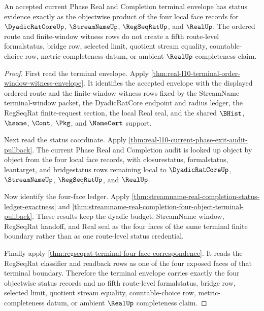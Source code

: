 \begin{theorem}
\label{thm:real-l10-terminal-envelope-status-locality}
An accepted current Phase Real and Completion terminal envelope has status
evidence exactly as the objectwise product of the four local face records for
$\DyadicRatCoreUp$, $\StreamNameUp$, $\RegSeqRatUp$, and $\RealUp$. The ordered
route and finite-window witness rows do not create a fifth route-level
formalstatus, bridge row, selected limit, quotient stream equality,
countable-choice row, metric-completeness datum, or ambient $\RealUp$
completeness claim.
\end{theorem}
\begin{proof}
First read the terminal envelope. Apply
\autoref{thm:real-l10-terminal-order-window-witness-envelope}. It identifies
the accepted envelope with the displayed ordered route and the finite-window
witness rows fixed by the StreamName terminal-window packet, the DyadicRatCore
endpoint and radius ledger, the RegSeqRat finite-request section, the local Real
seal, and the shared $\BHist$, $\hsame$, $\Cont$, $\Pkg$, and $\NameCert$
support.

Next read the status coordinate. Apply
\autoref{thm:real-l10-current-phase-exit-audit-pullback}. The current Phase
Real and Completion audit is looked up object by object from the four local face
records, with closurestatus, formalstatus, leantarget, and bridgestatus rows
remaining local to $\DyadicRatCoreUp$, $\StreamNameUp$, $\RegSeqRatUp$, and
$\RealUp$.

Now identify the four-face ledger. Apply
\autoref{thm:streamname-real-completion-status-ledger-exactness} and
\autoref{thm:streamname-real-completion-four-object-terminal-pullback}. These
results keep the dyadic budget, StreamName window, RegSeqRat handoff, and Real
seal as the four faces of the same terminal finite boundary rather than as one
route-level status credential.

Finally apply \autoref{thm:regseqrat-terminal-four-face-correspondence}. It
reads the RegSeqRat classifier and readback rows as one of the four exposed
faces of that terminal boundary. Therefore the terminal envelope carries
exactly the four objectwise status records and no fifth route-level
formalstatus, bridge row, selected limit, quotient stream equality,
countable-choice row, metric-completeness datum, or ambient $\RealUp$
completeness claim.
\end{proof}


